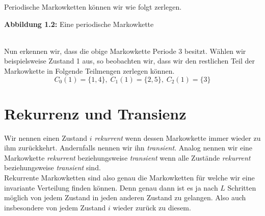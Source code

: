 \documentclass[a4paper]{article}
\begin{document}
Periodische Markowketten können wir wie folgt zerlegen.

\begin{center}
\end{center}
\qquad \caption{\textbf{Abbildung 1.2:} Eine periodische Markowkette}
\\

Nun erkennen wir, dass die obige Markowkette Periode 3 besitzt.
Wählen wir beispielsweise Zustand 1 aus, so beobachten wir, dass wir den restlichen Teil der Markowkette
in Folgende Teilmengen zerlegen können.
\[
	C_0(1) = \{
		1, 4
	\}, \; C_1 (1) = \{
		2, 5
	\}, \; C_2 (1) = \{
		3
	\} 
\]

\section{Rekurrenz und Transienz}
Wir nennen einen Zustand $i$ \textit{rekurrent} wenn dessen Markowkette immer wieder zu ihm zurückkehrt.
Andernfalls nennen wir ihn \textit{transient}.
Analog nennen wir eine Markowkette \textit{rekurrent} beziehungsweise \textit{transient} wenn alle Zustände
\textit{rekurrent} beziehungsweise \textit{transient} sind.
\\

Rekurrente Markowketten sind also genau die Markowketten für welche wir eine invariante Verteilung finden
können. Denn genau dann ist es ja nach $L$ Schritten möglich von jedem Zustand in jeden anderen Zustand
zu gelangen. Also auch insbesondere von jedem Zustand $i$ wieder zurück zu diesem.
\end{document}
